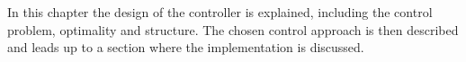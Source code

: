 \vspace{-6mm}
In this chapter the design of the controller is explained, including the control problem, optimality and structure. The chosen control approach is then described and leads up to a section where the implementation is discussed. 
\vspace{-4mm}
